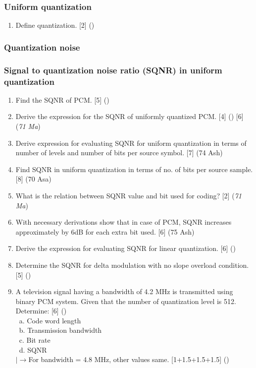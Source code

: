 \documentclass[12pt]{article}
\newcommand{\lb}{\\$\left|\rightarrow\right.$}
\newcommand{\enter}{\\\textcolor{white}{1}}
\begin{document}
    \subsubsection{Uniform quantization}
    	\begin{enumerate}
    		\item Define quantization. \hfill [2] ()
    	\end{enumerate}
    
    \subsubsection{Quantization noise}
    \subsubsection{Signal to quantization noise ratio (SQNR) in uniform quantization}
      \begin{enumerate}
        \item Find the SQNR of PCM. \hfill [5] ()

        \item Derive the expression for the SQNR of uniformly quantized PCM. \hfill [4] () [6] (\textit{71 Ma})
        
        \item Derive expression for evaluating SQNR for uniform quantization in terms of number of levels and number of bits per source symbol. \hfill [7] (74 Ash)
        
        \item Find SQNR in uniform quantization in terms of no. of bits per source sample. \hfill [8] (70 Asa)

        \item What is the relation between SQNR value and bit used for coding? \hfill [2] (\textit{71 Ma})
        
        \item With necessary derivations show that in case of PCM, SQNR increases approximately by 6dB for each extra bit used. \hfill [6] (75 Ash)
        
        \item Derive the expression for evaluating SQNR for linear quantization. \hfill [6] ()
        
        \item Determine the SQNR for delta modulation with no slope overload condition. \hfill [5] ()
        
        \item A television signal having a bandwidth of 4.2 MHz is transmitted using binary PCM system. Given that the number of quantization level is 512. Determine: \hfill [6] ()
        \enter a. Code word length
        \enter b. Transmission bandwidth
        \enter c. Bit rate
        \enter d. SQNR
        \lb For bandwidth = 4.8 MHz, other values same. \hfill [1+1.5+1.5+1.5] ()
      \end{enumerate}
\end{document}
